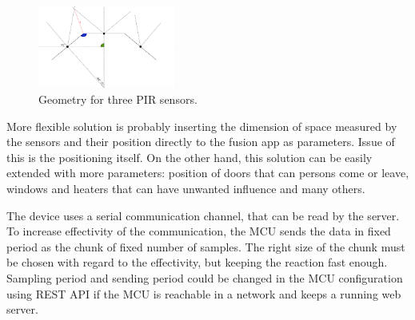 \begin{figure}[h!]
\begin{center}
\includegraphics[width=0.4\textwidth]{obrazky-figures/3pir_geometry.png}
\caption{Geometry for three PIR sensors.\label{fig:3pir_geometry}}
\end{center}
\end{figure}

More flexible solution is probably inserting the dimension of space measured by the sensors
and their position directly to the fusion app as parameters. Issue of this is the positioning
itself. On the other hand, this solution can be easily extended with more parameters:
position of doors that can persons come or leave, windows and heaters that can have
unwanted influence and many others.

The device uses a serial communication channel, that can be read by the server. To
increase effectivity of the communication, the MCU sends the data in fixed period
as the chunk of fixed number of samples. The right size of the chunk must be chosen
with regard to the effectivity, but keeping the reaction fast enough. Sampling period and
sending period could be changed in the MCU configuration using REST API if the MCU
is reachable in a network and keeps a running web server.






